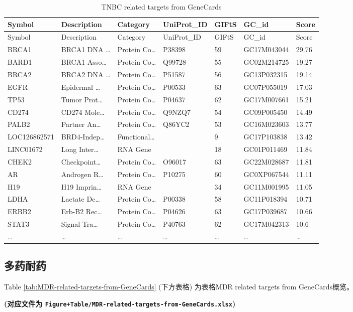 \documentclass[
]{article}
\begin{document}
\begin{longtable}[]{@{}lllllll@{}}
\caption{\label{tab:TNBC-related-targets-from-GeneCards}TNBC related targets from GeneCards}\tabularnewline
\toprule
Symbol & Description & Category & UniProt\_ID & GIFtS & GC\_id & Score\tabularnewline
\midrule
\endfirsthead
\toprule
Symbol & Description & Category & UniProt\_ID & GIFtS & GC\_id & Score\tabularnewline
\midrule
\endhead
BRCA1 & BRCA1 DNA \ldots{} & Protein Co\ldots{} & P38398 & 59 & GC17M043044 & 29.76\tabularnewline
BARD1 & BRCA1 Asso\ldots{} & Protein Co\ldots{} & Q99728 & 55 & GC02M214725 & 19.27\tabularnewline
BRCA2 & BRCA2 DNA \ldots{} & Protein Co\ldots{} & P51587 & 56 & GC13P032315 & 19.14\tabularnewline
EGFR & Epidermal \ldots{} & Protein Co\ldots{} & P00533 & 63 & GC07P055019 & 17.03\tabularnewline
TP53 & Tumor Prot\ldots{} & Protein Co\ldots{} & P04637 & 62 & GC17M007661 & 15.21\tabularnewline
CD274 & CD274 Mole\ldots{} & Protein Co\ldots{} & Q9NZQ7 & 54 & GC09P005450 & 14.49\tabularnewline
PALB2 & Partner An\ldots{} & Protein Co\ldots{} & Q86YC2 & 53 & GC16M023603 & 13.77\tabularnewline
LOC126862571 & BRD4-Indep\ldots{} & Functional\ldots{} & & 9 & GC17P103838 & 13.42\tabularnewline
LINC01672 & Long Inter\ldots{} & RNA Gene & & 18 & GC01P011469 & 11.84\tabularnewline
CHEK2 & Checkpoint\ldots{} & Protein Co\ldots{} & O96017 & 63 & GC22M028687 & 11.81\tabularnewline
AR & Androgen R\ldots{} & Protein Co\ldots{} & P10275 & 60 & GC0XP067544 & 11.11\tabularnewline
H19 & H19 Imprin\ldots{} & RNA Gene & & 34 & GC11M001995 & 11.05\tabularnewline
LDHA & Lactate De\ldots{} & Protein Co\ldots{} & P00338 & 58 & GC11P018394 & 10.71\tabularnewline
ERBB2 & Erb-B2 Rec\ldots{} & Protein Co\ldots{} & P04626 & 63 & GC17P039687 & 10.66\tabularnewline
STAT3 & Signal Tra\ldots{} & Protein Co\ldots{} & P40763 & 62 & GC17M042313 & 10.6\tabularnewline
\ldots{} & \ldots{} & \ldots{} & \ldots{} & \ldots{} & \ldots{} & \ldots{}\tabularnewline
\bottomrule
\end{longtable}

\hypertarget{ux591aux836fux8010ux836f}{%
\subsection{多药耐药}\label{ux591aux836fux8010ux836f}}

Table \ref{tab:MDR-related-targets-from-GeneCards} (下方表格) 为表格MDR related targets from GeneCards概览。

\textbf{(对应文件为 \texttt{Figure+Table/MDR-related-targets-from-GeneCards.xlsx})}
\end{document}
